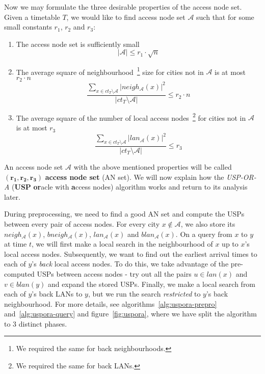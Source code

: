     \noindent Now we may formulate the three desirable properties of the access node set. Given a timetable $T$, we would like to find access node set $\mathcal{A}$ such that for some small constants $r_{1}$, $r_{2}$ and $r_{3}$:
    \begin{enumerate}
		\item The access node set is sufficiently small \\
		\begin{equation} \label{eq:r1}
			|\mathcal{A}| \leq r_{1} \cdot \sqrt{n}
		\end{equation}
		\item The average square of neighbourhood~\footnote{We required the same for back neighbourhoods.} size for cities not in $\mathcal{A}$ is at most $r_{2} \cdot n$ \\
		\begin{equation} \label{eq:r2}
			\frac{\displaystyle \sum_{x \in ct_{T} \setminus \mathcal{A}}|neigh_{\mathcal{A}}(x)|^{2}}{\displaystyle |ct_{T} \setminus \mathcal{A}|} \leq r_{2} \cdot n
		\end{equation}
		\item The average square of the number of local access nodes~\footnote{We required the same for back LANs.} for cities not in $\mathcal{A}$ is at most $r_{3}$ \\
		\begin{equation} \label{eq:r3}
			\frac{\displaystyle \sum_{x \in ct_{T} \setminus \mathcal{A}}|lan_{\mathcal{A}}(x)|^{2}}{\displaystyle |ct_{T} \setminus \mathcal{A}|} \leq r_{3}
		\end{equation}
	\end{enumerate}
	\hspace{\fill}
	
	\noindent An access node set $\mathcal{A}$ with the above mentioned properties will be called $\bm{(r_{1}, r_{2}, r_{3})}$ \textbf{access node set} (AN set). We will now explain how the \textit{USP-OR-A} (\textbf{USP} \textbf{or}acle with \textbf{a}ccess nodes) algorithm works and return to its analysis later. 
	
	During preprocessing, we need to find a good AN set and compute the USPs between every pair of access nodes. For every city $x \not \in \mathcal{A}$, we also store its $neigh_{\mathcal{A}}(x)$, $bneigh_{\mathcal{A}}(x)$, $lan_{\mathcal{A}}(x)$ and $blan_{\mathcal{A}}(x)$. On a query from $x$ to $y$ at time $t$, we will first make a local search in the neighbourhood of $x$ up to $x$'s local access nodes. Subsequently, we want to find out the earliest arrival times to each of $y$'s \textit{back} local access nodes. To do this, we take advantage of the pre-computed USPs between access nodes - try out all the pairs $u \in lan(x)$ and $v \in blan(y)$ and expand the stored USPs. Finally, we make a local search from each of $y$'s back LANs to $y$, but we run the search \textit{restricted} to $y$'s back neighbourhood. For more details, see algorithms~\ref{alg:uspora-prepro} and~\ref{alg:uspora-query} and figure~\ref{fig:uspora}, where we have split the algorithm to 3 distinct phases.
	
